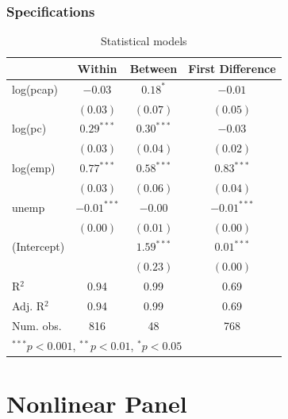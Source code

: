 \documentclass{beamer}
\newcommand{\1}{\mathbb{1}}
\begin{document}
\begin{frame}\frametitle{Specifications}
\begin{table}
\begin{center}
\begin{tabular}{l c c c }
\hline
 & Within & Between & First Difference \\
\hline
log(pcap)   & $-0.03$       & $0.18^{*}$   & $-0.01$       \\
            & $(0.03)$      & $(0.07)$     & $(0.05)$      \\
log(pc)     & $0.29^{***}$  & $0.30^{***}$ & $-0.03$       \\
            & $(0.03)$      & $(0.04)$     & $(0.02)$      \\
log(emp)    & $0.77^{***}$  & $0.58^{***}$ & $0.83^{***}$  \\
            & $(0.03)$      & $(0.06)$     & $(0.04)$      \\
unemp       & $-0.01^{***}$ & $-0.00$      & $-0.01^{***}$ \\
            & $(0.00)$      & $(0.01)$     & $(0.00)$      \\
(Intercept) &               & $1.59^{***}$ & $0.01^{***}$  \\
            &               & $(0.23)$     & $(0.00)$      \\
\hline
R$^2$       & 0.94          & 0.99         & 0.69          \\
Adj. R$^2$  & 0.94          & 0.99         & 0.69          \\
Num. obs.   & 816           & 48           & 768           \\
\hline
\multicolumn{4}{l}{\scriptsize{$^{***}p<0.001$, $^{**}p<0.01$, $^*p<0.05$}}
\end{tabular}
\caption{Statistical models}
\label{table:coefficients}
\end{center}
\end{table}
\end{frame}

\section{Nonlinear Panel}

\begin{frame}\frametitle{}
\end{frame}

\begin{frame}\frametitle{}
\end{frame}

\begin{frame}\frametitle{}
\end{frame}

\begin{frame}\frametitle{}
\end{frame}
\end{document}
